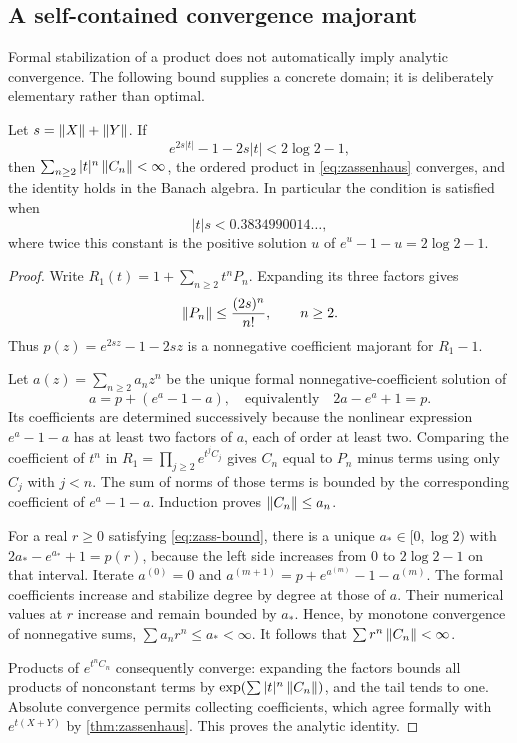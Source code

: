\subsection{A self-contained convergence majorant}
Formal stabilization of a product does not automatically imply analytic convergence. The following bound supplies a concrete domain; it is deliberately elementary rather than optimal.

\begin{theorem}\label{thm:zass-convergence}
Let $s=\left\lVert X\right\rVert+\left\lVert Y\right\rVert$. If
\begin{equation}\label{eq:zass-bound}
 e^{2s|t|}-1-2s|t|<2\log2-1,
\end{equation}
then $\sum_{n\geq2}|t|^n\left\lVert C_n\right\rVert<\infty$, the ordered product in \cref{eq:zassenhaus} converges, and the identity holds in the Banach algebra. In particular the condition is satisfied when
\[
 |t|s<0.3834990014\ldots,
\]
where twice this constant is the positive solution $u$ of $e^u-1-u=2\log2-1$.
\end{theorem}
\begin{proof}
Write $R_1(t)=1+\sum_{n\geq2}t^nP_n$. Expanding its three factors gives
\[
 \left\lVert P_n\right\rVert\leq\frac{(2s)^n}{n!},\qquad n\geq2.
\]
Thus $p(z)=e^{2sz}-1-2sz$ is a nonnegative coefficient majorant for $R_1-1$.

Let $a(z)=\sum_{n\geq2}a_nz^n$ be the unique formal nonnegative-coefficient solution of
\begin{equation}\label{eq:zass-majorant-eq}
 a=p+(e^a-1-a),\quad\text{equivalently}\quad 2a-e^a+1=p.
\end{equation}
Its coefficients are determined successively because the nonlinear expression $e^a-1-a$ has at least two factors of $a$, each of order at least two. Comparing the coefficient of $t^n$ in
$R_1=\prod_{j\geq2}e^{t^jC_j}$ gives $C_n$ equal to $P_n$ minus terms using only $C_j$ with $j<n$. The sum of norms of those terms is bounded by the corresponding coefficient of $e^a-1-a$. Induction proves $\left\lVert C_n\right\rVert\leq a_n$.

For a real $r\geq0$ satisfying \cref{eq:zass-bound}, there is a unique $a_*\in[0,\log2)$ with
$2a_*-e^{a_*}+1=p(r)$, because the left side increases from $0$ to $2\log2-1$ on that interval. Iterate
$a^{(0)}=0$ and $a^{(m+1)}=p+e^{a^{(m)}}-1-a^{(m)}$.
The formal coefficients increase and stabilize degree by degree at those of $a$. Their numerical values at $r$ increase and remain bounded by $a_*$. Hence, by monotone convergence of nonnegative sums,
$\sum a_nr^n\leq a_*<\infty$. It follows that $\sum r^n\left\lVert C_n\right\rVert<\infty$.

Products of $e^{t^nC_n}$ consequently converge: expanding the factors bounds all products of nonconstant terms by
$\exp(\sum |t|^n\left\lVert C_n\right\rVert)$, and the tail tends to one. Absolute convergence permits collecting coefficients, which agree formally with $e^{t(X+Y)}$ by \cref{thm:zassenhaus}. This proves the analytic identity.
\end{proof}

